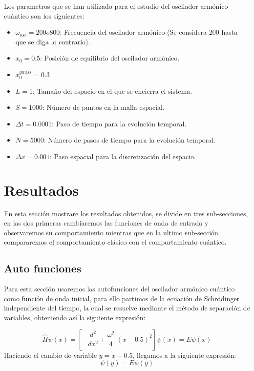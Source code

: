 \documentclass[10pt,onecolumn]{article}
\begin{document}
Los parametros que se han utilizado para el estudio del oscilador armónico cuántico son los siguientes:
\begin{itemize}
    \item $\omega_{osc} = 200 o 800$: Frecuencia del oscilador armónico (Se considera 200 hasta que se diga lo contrario).
    \item $x_0 = 0.5$: Posición de equilibrio del oscilador armónico.
    \item $x_0^{gauss} = 0.3$
    \item $L = 1$: Tamaño del espacio en el que se encierra el sistema.
    \item $S = 1000$: Número de puntos en la malla espacial.
    \item $\Delta t = 0.0001 $: Paso de tiempo para la evolución temporal.
    \item $N = 5000$: Número de pasos de tiempo para la evolución temporal.
    \item $\Delta x = 0.001$: Paso espacial para la discretización del espacio.
\end{itemize}




\section{Resultados}
En esta sección mostrare los resultados obtenidos, se divide en tres sub-secciones, en las dos primeras cambiaremos las funciones de onda de entrada y observaremos su comportamiento mientras que en la ultimo sub-sección compararemos el comportamiento clásico con el comportamiento cuántico.

\subsection{Auto funciones}
\label{subsec:Autofunciones}
Para esta sección usaremos las autofunciones del oscilador armónico cuántico como función de onda inicial, para ello partimos de la ecuación de Schrödinger independiente del tiempo, la cual se resuelve mediante el método de separación de variables, obteniendo así la siguiente expresión:

\begin{equation}
    \hat{H}\psi(x) =[-\dfrac{d^2}{dx^2} + \dfrac{\omega^2}{4}\ (x-0.5)^2] \psi(x) = E\psi(x)
\end{equation}
Haciendo el cambio de variable $y = x - 0.5$, llegamos a la siguiente expresión:
\begin{equation}
    [-\dfrac{d^2}{dy^2} + \dfrac{\omega^2}{4}\ y^2] \psi(y) = E\psi(y)
\end{equation}
\end{document}
